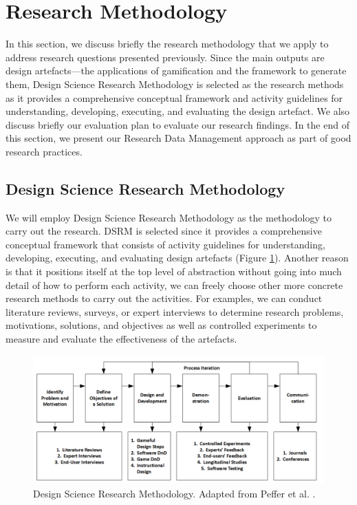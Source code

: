 \documentclass[12pt, a4paper]{report}
\begin{document}
{\section{Research Methodology}
In this section, we discuss briefly the research methodology that we apply to address research questions presented previously. Since the main outputs are design artefacts---the applications of gamification and the framework to generate them, Design Science Research Methodology \cite{peffers2007design} is selected as the research methods as it provides a comprehensive conceptual framework and activity guidelines for understanding, developing, executing, and evaluating the design artefact. We also discuss briefly our evaluation plan to evaluate our research findings. In the end of this section, we present our Research Data Management approach as part of good research practices.   

\subsection{Design Science Research Methodology}
We will employ Design Science Research Methodology \cite{peffers2007design} as the methodology to carry out the research. DSRM is selected since it provides a comprehensive conceptual framework that consists of activity guidelines for understanding, developing, executing, and evaluating design artefacts (Figure \ref{dsrm}). Another reason is that it positions itself at the top level of abstraction without going into much detail of how to perform each activity, we can freely choose other more concrete research methods to carry out the activities. For examples, we can conduct literature reviews, surveys, or expert interviews to determine research problems, motivations, solutions, and objectives as well as controlled experiments to measure and evaluate the effectiveness of the artefacts. 

\begin{figure}[ht]
\centering
\includegraphics[width=\textwidth]{dsrm}
\caption{Design Science Research Methodology. Adapted from Peffer et al. \cite{peffers2007design}.}
\label{dsrm}
\end{figure}

}
\end{document}
